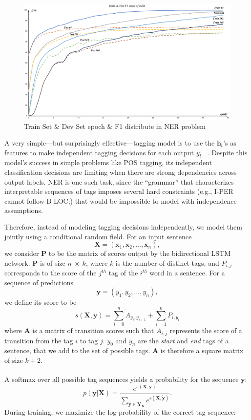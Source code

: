 \begin{figure}[t]
    \begin{center}
        \includegraphics[width=\textwidth]{figures/batch2.pdf}
    \end{center}
    \caption{Train Set \& Dev Set epoch \& F1 distribute in NER problem}
    \label{fig:batch2}
\end{figure}

A very simple---but surprisingly effective---tagging model is to use the $\mathbf{h}_t$'s as features to make independent tagging decisions for each output $y_t$ ~\cite{ling2015finding}. Despite this model's success in simple problems like POS tagging, its independent classification decisions are limiting when there are strong dependencies across output labels. NER is one such task, since the ``grammar'' that characterizes interpretable sequences of tags imposes several hard constraints (e.g., I-PER cannot follow B-LOC;) that would be impossible to model with independence assumptions.

Therefore, instead of modeling tagging decisions independently, we model them jointly using a conditional random field. For an input sentence
$$\mathbf{X} = (\mathbf{x}_1, \mathbf{x}_2, \ldots, \mathbf{x}_n),$$
we consider $\mathbf{P}$ to be the matrix of scores output by the bidirectional LSTM network. $\mathbf{P}$ is of size $n~\times~k$, where $k$ is the number of distinct tags, and $P_{i, j}$ corresponds to the score of the $j^{th}$ tag of the $i^{th}$ word in a sentence. For a sequence of predictions
$$\mathbf{y} = (y_1, y_2, \ldots, y_n),$$
we define its score to be
$$s(\mathbf{X}, \mathbf{y})=\sum_{i=0}^{n} A_{y_i, y_{i+1}} + \sum_{i=1}^{n} P_{i, y_i}$$
where $\mathbf{A}$ is a matrix of transition scores such that $A_{i, j}$ represents the score of a transition from the tag $i$ to tag $j$. $y_0$ and $y_n$ are the \textit{start} and \textit{end} tags of a sentence, that we add to the set of possible tags. $\mathbf{A}$ is therefore a square matrix of size $k+2$.
\\
\\
A softmax over all possible tag sequences yields a probability for the sequence $\mathbf{y}$:
$$p(\mathbf{y} | \mathbf{X}) = \frac{
	e^{s(\mathbf{X}, \mathbf{y})}
}{
	\sum_{\mathbf{\widetilde{y}} \in \mathbf{Y_X}} e^{s(\mathbf{X}, \mathbf{\widetilde{y}})}
}.$$
During training, we maximize the log-probability of the correct tag sequence:

